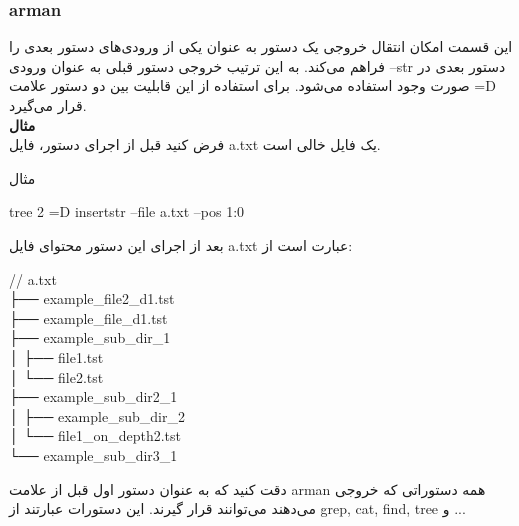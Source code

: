 \documentclass[]{article}
\begin{document}
\subsubsection*{{\titr arman}}

این قسمت امکان انتقال خروجی یک دستور به عنوان یکی از ورودی‌های دستور بعدی را فراهم می‌کند. به این ترتیب خروجی دستور قبلی به عنوان ورودی --str دستور بعدی در صورت وجود استفاده می‌شود. برای استفاده از این قابلیت بین دو دستور علامت =D قرار می‌گیرد.\\

\textbf{مثال}\\

فرض کنید قبل از اجرای دستور، فایل a.txt یک فایل خالی است.


\begin{mybox}[colback=yellow]{مثال}
	\begin{latin}	
		tree 2 =D insertstr --file a.txt --pos 1:0
	\end{latin}
\end{mybox}

\newpage
بعد از اجرای این دستور محتوای فایل a.txt عبارت است از:\\

\begin{latin}
// a.txt\\
├── example\_file2\_d1.tst\\
├── example\_file\_d1.tst\\
├── example\_sub\_dir\_1\\
│   ├── file1.tst\\
│   └── file2.tst\\
├── example\_sub\_dir2\_1\\
│   ├── example\_sub\_dir\_2\\
│   └── file1\_on\_depth2.tst\\
└── example\_sub\_dir3\_1\\
\end{latin}

دقت کنید که به عنوان دستور اول قبل از علامت arman همه دستوراتی که خروجی می‌دهند می‌توانند قرار گیرند. این دستورات عبارتند از grep, cat, find, tree و ...\\
\end{document}
